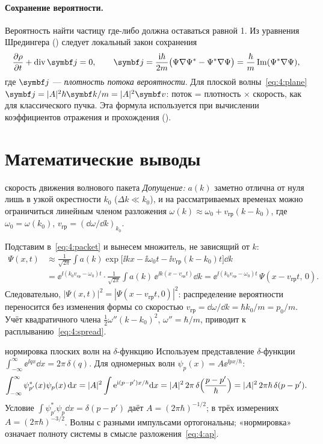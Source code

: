 \paragraph{Сохранение вероятности.} Вероятность найти частицу где-либо должна оставаться
равной 1. Из уравнения Шредингера () следует локальный закон сохранения
\begin{equation}\label{eq:4:cont}
  \pdiff{\rho}{t}+\operatorname{div}\vect j=0,\qquad
  \vect j=\frac{\ii\hbar}{2m}\bigl(\Psi\nabla\Psi^*-\Psi^*\nabla\Psi\bigr)
  =\frac{\hbar}{m}\operatorname{Im}(\Psi^*\nabla\Psi),
\end{equation}
где $\vect j$ — \emph{плотность потока вероятности}. Для плоской волны~\eqref{eq:4:plane}
$\vect j=|A|^2\hbar\vect k/m=|A|^2\vect v$: поток = плотность $\times$ скорость, как для
классического пучка. Эта формула используется при вычислении коэффициентов отражения и
прохождения ().

\section{Математические выводы}

\begin{derivation}[label=der:4:group]{скорость движения волнового пакета}
\emph{Допущение:} $a(k)$ заметно отлична от нуля лишь в узкой окрестности $k_0$ ($\Delta k\ll k_0$),
и на рассматриваемых временах можно ограничиться линейным членом разложения
$\omega(k)\approx\omega_0+v_{\text{гр}}(k-k_0)$, где $\omega_0=\omega(k_0)$, $v_{\text{гр}}=(\dd\omega/\dd k)_{k_0}$.

Подставим в~\eqref{eq:4:packet} и вынесем множитель, не зависящий от $k$:
\begin{align*}
  \Psi(x,t)&\approx\frac{1}{\sqrt{2\pi}}\int a(k)\exp\bigl[\ii kx-\ii\omega_0t-\ii v_{\text{гр}}(k-k_0)t\bigr]\dd k\\
  &=\ee^{\ii(k_0v_{\text{гр}}-\omega_0)t}\cdot\frac{1}{\sqrt{2\pi}}\int a(k)\,\ee^{\ii k(x-v_{\text{гр}}t)}\dd k
  =\ee^{\ii(k_0v_{\text{гр}}-\omega_0)t}\,\Psi(x-v_{\text{гр}}t,\,0).
\end{align*}
Следовательно, $|\Psi(x,t)|^2=|\Psi(x-v_{\text{гр}}t,0)|^2$: распределение вероятности переносится
без изменения формы со скоростью $v_{\text{гр}}=\dd\omega/\dd k=\hbar k_0/m=p_0/m$. Учёт квадратичного
члена $\frac12\omega''(k-k_0)^2$, $\omega''=\hbar/m$, приводит к расплыванию~\eqref{eq:4:spread}.
\end{derivation}

\begin{derivation}[label=der:4:delta]{нормировка плоских волн на $\delta$-функцию}
Используем представление $\delta$-функции $\int_{-\infty}^{\infty}\ee^{\ii qx}\dd x=2\pi\,\delta(q)$.
Для одномерных волн $\psi_p(x)=A\ee^{\ii px/\hbar}$:
\[
  \int_{-\infty}^{\infty}\psi_{p'}^*(x)\psi_p(x)\,\mathrm{d} x=|A|^2\int\mathrm{e}^{\mathrm{i}(p-p')x/\hbar}\mathrm{d} x
  =|A|^2\,2\pi\,\delta\Bigl(\frac{p-p'}{\hbar}\Bigr)=|A|^2\,2\pi\hbar\,\delta(p-p').
\]
Условие $\int\psi_{p'}^*\psi_p\dd x=\delta(p-p')$ даёт $A=(2\pi\hbar)^{-1/2}$; в трёх измерениях
$A=(2\pi\hbar)^{-3/2}$. Волны с разными импульсами ортогональны; «нормировка» означает
полноту системы в смысле разложения~\eqref{eq:4:ap}.
\end{derivation}

